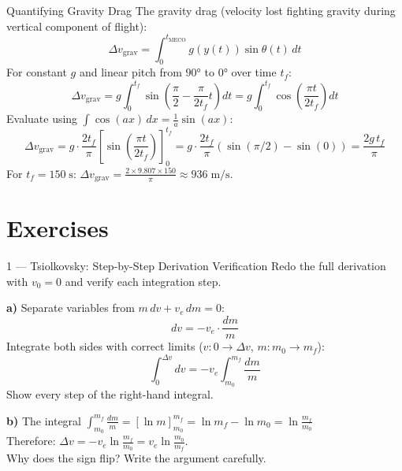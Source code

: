 \documentclass[12pt, a4paper]{article}
\begin{document}
\begin{theorybox}{Quantifying Gravity Drag}
The gravity drag (velocity lost fighting gravity during vertical component of flight):
\[
  \Delta v_\text{grav} = \int_0^{t_\text{MECO}} g(y(t))\sin\theta(t)\,dt
\]
For constant $g$ and linear pitch from $90°$ to $0°$ over time $t_f$:
\[
  \Delta v_\text{grav} = g\int_0^{t_f}\sin\!\left(\frac{\pi}{2} - \frac{\pi}{2t_f}t\right)dt
  = g\int_0^{t_f}\cos\!\left(\frac{\pi t}{2t_f}\right)dt
\]
Evaluate using $\int\cos(ax)\,dx = \frac{1}{a}\sin(ax)$:
\[
  \Delta v_\text{grav} = g\cdot\frac{2t_f}{\pi}\left[\sin\!\left(\frac{\pi t}{2t_f}\right)\right]_0^{t_f}
  = g\cdot\frac{2t_f}{\pi}(\sin(\pi/2) - \sin(0)) = \frac{2g\,t_f}{\pi}
\]
For $t_f = 150\;\text{s}$: $\Delta v_\text{grav} = \frac{2\times 9.807 \times 150}{\pi} \approx 936\;\text{m/s}$.
\end{theorybox}

\section{Exercises}

\begin{exercisebox}{1 — Tsiolkovsky: Step-by-Step Derivation Verification}
Redo the full derivation with $v_0 = 0$ and verify each integration step.

\textbf{a)} Separate variables from $m\,dv + v_e\,dm = 0$:
\[
  dv = -v_e\cdot\frac{dm}{m}
\]
Integrate both sides with correct limits ($v: 0 \to \Delta v$, $m: m_0 \to m_f$):
\[
  \int_0^{\Delta v} dv = -v_e\int_{m_0}^{m_f}\frac{dm}{m}
\]
Show every step of the right-hand integral.

\textbf{b)} The integral $\int_{m_0}^{m_f}\frac{dm}{m} = [\ln m]_{m_0}^{m_f} = \ln m_f - \ln m_0 = \ln\frac{m_f}{m_0}$\\
Therefore: $\Delta v = -v_e\ln\frac{m_f}{m_0} = v_e\ln\frac{m_0}{m_f}$.\\
Why does the sign flip? Write the argument carefully.
\end{exercisebox}

\begin{solutionspace}[8cm]
\end{solutionspace}
\end{document}
